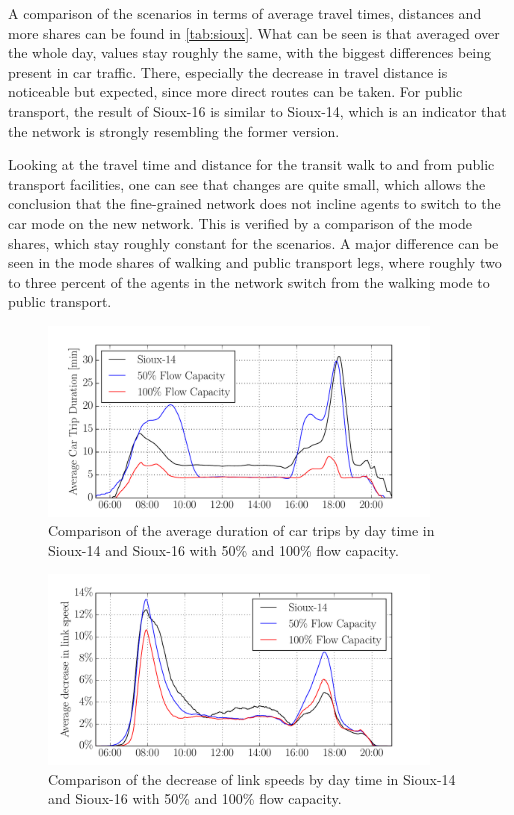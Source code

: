 A comparison of the scenarios in terms of average travel times, distances and more
shares can be found in \cref{tab:sioux}. What can be seen is that averaged over
the whole day, values stay roughly the same, with the biggest differences being
present in car traffic. There, especially the decrease in travel distance is
noticeable but expected, since more direct routes can be taken.
For public transport, the result of Sioux-16 is similar to Sioux-14, which is
an indicator that the network is strongly resembling the former version.

Looking at the travel time and distance for the transit walk to and from public
transport facilities, one can see that changes are quite small, which allows the
conclusion that the fine-grained network does not incline agents to switch to the
car mode on the new network. This is verified by a comparison of the mode shares,
which stay roughly constant for the scenarios. A major difference can be seen in
the mode shares of walking and public transport legs, where roughly two to three
percent of the agents in the network switch from the walking mode to public
transport.

\begin{figure}
    \centering
    \includegraphics[width=0.9\textwidth]{figures/sioux_times.pdf}
    \caption{Comparison of the average duration of car trips by day time in Sioux-14 and Sioux-16 with 50\% and 100\% flow capacity.}
    \label{fig:sioux_times}
\end{figure}

\begin{figure}
    \centering
    \includegraphics[width=0.9\textwidth]{figures/sioux_speeds.pdf}
    \caption{Comparison of the decrease of link speeds by day time in Sioux-14 and Sioux-16 with 50\% and 100\% flow capacity.}
    \label{fig:sioux_speeds}
\end{figure}


